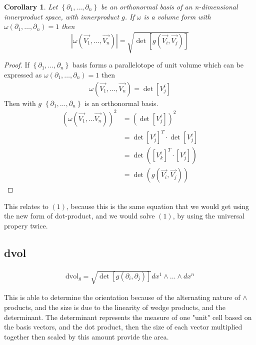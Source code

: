 \documentclass[12pt]{armath}
\newtheorem{corollary}{Corollary}[section]
\newcommand{\abs}[1]{\left\vert{#1}\right\vert}
\newcommand{\dvol}{\text{dvol}_g}
\newcommand{\kpn}[1]{\partial_{1},\ldots,\partial_{#1}}
\begin{document}
  \begin{corollary}
    Let $\left\{\partial_1,\ldots,\partial_n\right\}$ be an orthonormal basis of
    an n-dimensional innerproduct space, with innerproduct $g$. If $\omega$ is a
    volume form with $\omega(\partial_1,\ldots,\partial_n)=1$ then
    \[
      \abs{\omega(\vec{V_1},\ldots,\vec{V_n})}=\sqrt{\det\left[g(\vec{V_i},
      \vec{V_j})\right]}
    \]
  \end{corollary}

  \begin{proof}
    If $\left\{\kpn{n}\right\}$ basis forms a parallelotope of unit volume
    which can be expressed as
    $\omega\left(\kpn{n}\right)=1$ then
    \begin{align*}
      \omega\left(\vec{V_1},\ldots,\vec{V_n}\right)=\det\left[V_j^i\right]
    \end{align*}
    Then with $g$ $\left\{\kpn{n}\right\}$ is an orthonormal basis.
    \begin{align*}
      \left(\omega\left(\vec{V_1},\ldots\vec{V_n}\right)\right)^2
      &=\left(\det\left[V_j^i\right]\right)^2\\
      &={\det\left[V_j^i\right]}^T\cdot\det\left[V_j^i\right]\\
      &=\det\left(\left[V_k^i\right]^T\cdot\left[V_j^i\right]\right)\\
      &=\det\left(g\left(\vec{V_i},\vec{V_j}\right)\right)
    \end{align*}
  \end{proof}

  This relates to $(1)$, because this is the same equation that we would get
  using the new form of dot-product, and we would solve $(1)$, by using the
  universal propery twice.

  \subsection{dvol}%
  \label{sub:_dvol}
  \begin{align*}
    \dvol=\sqrt{\det\left[g(\partial_i,\partial_j)\right]}dx^1\wedge\ldots\wedge
    dx^n
  \end{align*}

  This is able to determine the orientation because of the alternating nature of
  $\wedge$ products, and the size is due to the linearity of wedge products, and
  the determinant. The determinant represents the measure of one "unit" cell
  based on the basis vectors, and the dot product, then the size of each vector
  multiplied together then scaled by this amount provide the area.
\end{document}

